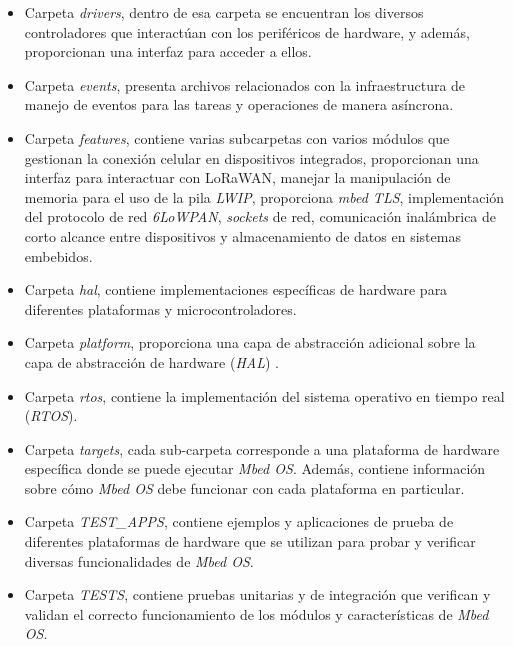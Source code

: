\begin{itemize}

    \item Carpeta \textit{drivers}, dentro de esa carpeta se encuentran los diversos controladores que interactúan con los periféricos de hardware, y además, proporcionan una interfaz para acceder a ellos. 
	
    \item Carpeta \textit{events}, presenta archivos relacionados con la infraestructura de manejo de eventos para las tareas y operaciones de manera asíncrona.

    \item Carpeta \textit{features}, contiene varias subcarpetas con varios módulos que gestionan la conexión celular en dispositivos integrados, proporcionan una interfaz para interactuar con LoRaWAN, manejar la manipulación de memoria para el uso de la pila \textit{LWIP}, proporciona \textit{mbed TLS}, implementación del protocolo de red \textit{6LoWPAN}, \textit{sockets} de red, comunicación inalámbrica de corto alcance entre dispositivos y almacenamiento de datos en sistemas embebidos. 
	
    \item Carpeta \textit{hal}, contiene implementaciones específicas de hardware para diferentes plataformas y microcontroladores.  
	
    \item Carpeta \textit{platform}, proporciona una capa de abstracción adicional sobre la capa de abstracción de hardware (\textit{HAL}) .
	
    \item Carpeta \textit{rtos}, contiene la implementación del sistema operativo en tiempo real (\textit{RTOS}).
	
    \item Carpeta \textit{targets}, cada sub-carpeta corresponde a una plataforma de hardware específica donde se puede ejecutar \textit{Mbed OS}. Además, contiene información sobre cómo \textit{Mbed OS} debe funcionar con cada plataforma en particular.

    \item Carpeta \textit{TEST\_APPS}, contiene ejemplos y aplicaciones de prueba de diferentes plataformas de hardware que se utilizan para probar y verificar diversas funcionalidades de \textit{Mbed OS}.
	
    \item Carpeta \textit{TESTS}, contiene pruebas unitarias y de integración que verifican y validan el correcto funcionamiento de los módulos y características de \textit{Mbed OS}.
	

\end{itemize}
